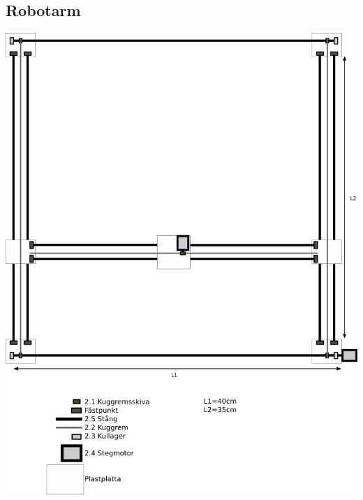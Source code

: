\documentclass[a4paper]{article}
\begin{document}
\begin{appendix}
\subsection{Robotarm}\label{arm}
\includegraphics[width=\textwidth]{arm}


\end{appendix}
\end{document}

